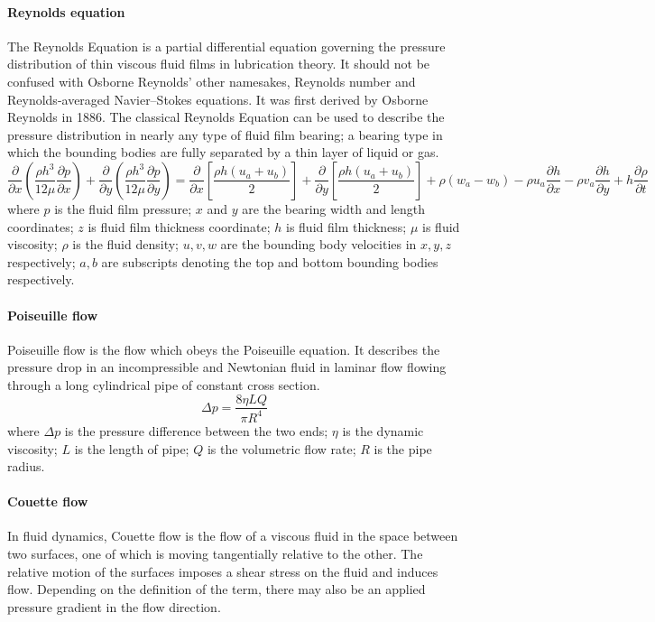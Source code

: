 \documentclass[books,12pt]{elegantpaper}
\begin{document}
\paragraph{Reynolds equation}
The Reynolds Equation is a partial differential equation governing the pressure distribution of thin viscous fluid films in lubrication theory. It should not be confused with Osborne Reynolds' other namesakes, Reynolds number and Reynolds-averaged Navier–Stokes equations. It was first derived by Osborne Reynolds in 1886. The classical Reynolds Equation can be used to describe the pressure distribution in nearly any type of fluid film bearing; a bearing type in which the bounding bodies are fully separated by a thin layer of liquid or gas.
$$ \frac{\partial}{\partial x} \left( \frac{\rho h^3}{12 \mu} \frac{\partial p}{\partial x} \right) + \frac{\partial}{\partial y} \left( \frac{\rho h^3}{12 \mu} \frac{\partial p}{\partial y} \right) = \frac{\partial}{\partial x} \left[ \frac{\rho h (u_a + u_b)}{2} \right] + \frac{\partial}{\partial y} \left[ \frac{\rho h (u_a + u_b)}{2} \right] + \rho (w_a - w_b) - \rho u_a \frac{\partial h}{\partial x} - \rho v_a \frac{\partial h}{\partial y} + h \frac{\partial \rho}{\partial t} $$
where $p$ is the fluid film pressure; $x$ and $y$ are the bearing width and length coordinates; $z$ is fluid film thickness coordinate; $h$ is fluid film thickness; $\mu$ is fluid viscosity; $\rho$ is the fluid density; $u,v,w$ are the bounding body velocities in $x,y,z$ respectively; $a,b$ are subscripts denoting the top and bottom bounding bodies respectively.

\paragraph{Poiseuille flow} Poiseuille flow is the flow which obeys the Poiseuille equation. It describes the pressure drop in an incompressible and Newtonian fluid in laminar flow flowing through a long cylindrical pipe of constant cross section.
$$ \Delta p = \frac{8 \eta L Q}{\pi R^4} $$
where $\Delta p$ is the pressure difference between the two ends; $\eta$ is the dynamic viscosity; $L$ is the length of pipe; $Q$ is the volumetric flow rate; $R$ is the pipe radius.


\paragraph{Couette flow}
In fluid dynamics, Couette flow is the flow of a viscous fluid in the space between two surfaces, one of which is moving tangentially relative to the other. The relative motion of the surfaces imposes a shear stress on the fluid and induces flow. Depending on the definition of the term, there may also be an applied pressure gradient in the flow direction.
\end{document}
